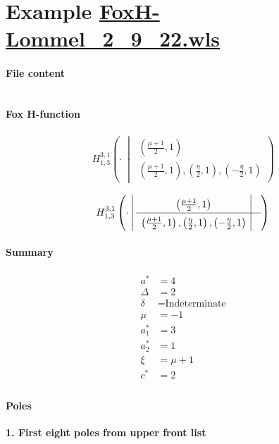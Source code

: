 \documentclass[11pt]{article}
\newcommand{\FoxH}[5]{H_{#2}^{#1}\left(#3\:\middle\vert\: \begin{array}{l}#4\\[0.4em] #5\end{array}\right)}
\begin{document}
\section{Example \url{FoxH-Lommel_2_9_22.wls}}

\paragraph{File content}

\inputminted{text}{FoxH-Lommel_2_9_22.wls}

\paragraph{Fox H-function}

\begin{align*}
  \FoxH
    {3,1}
    {1,3}
    {\cdot}
    {\left(\frac{\mu +1}{2}, 1\right)}
    {\left(\frac{\mu +1}{2}, 1\right), \left(\frac{\eta }{2}, 1\right), \left(-\frac{\eta }{2}, 1\right)}
\end{align*}

\begin{align*}
  \FoxHext
    {3,1}
    {1,3}
    {\cdot}
    {\left(\frac{\mu +1}{2}, 1\right)}
    {}
    {\left(\frac{\mu +1}{2}, 1\right), \left(\frac{\eta }{2}, 1\right), \left(-\frac{\eta }{2}, 1\right)}
    {}
\end{align*}

\paragraph{Summary}

\begin{align*}
  a^*    & = 4 \\
  \Delta & = 2 \\
  \delta & = \text{Indeterminate} \\
  \mu    & = -1 \\
  a_1^*  & = 3 \\
  a_2^*  & = 1 \\
  \xi    & = \mu +1 \\
  c^*    & = 2 \\
\end{align*}

\paragraph{Poles}

\noindent\textbf{1. First eight poles from upper front list}
\end{document}
